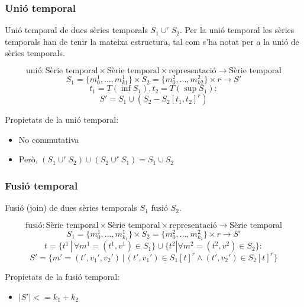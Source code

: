 \subsubsection{Unió temporal}

Unió temporal de dues sèries temporals $S_1 \cup^r S_2$. Per la unió temporal les sèries temporals han de tenir la mateixa estructura, tal com s'ha notat per a la unió de sèries temporals.

\begin{definition}
  \[
  \text{unió}: \text{Sèrie temporal} \times \text{Sèrie temporal}
  \times \text{representació} \longrightarrow \text{Sèrie temporal}
  \]
  \[
  S_1 = \{m_0^1 , \ldots , m_{k1}^1\}  \times S_2 = \{m_0^2 , \ldots , m_{k2}^2\} \times r \longrightarrow S'
  \]
  \[
  t_1=T(\inf S_1), t_2=T(\sup S_1):
  \]
  \[
  S' = S_1 \cup  ( S_2 - S_2[t_1,t_2]^r )
  \] 
\end{definition}



Propietats de la unió temporal:
\begin{itemize}
\item No commutativa
\item Però, $(S_1 \cup^r S_2) \cup (S_2 \cup^r S_1) = S_1 \cup S_2$
\end{itemize}



\subsubsection{Fusió temporal}

Fusió (join) de dues sèries temporals $S_1 \text{ fusió } S_2$.


\begin{definition}
  \[
  \text{fusió}: \text{Sèrie temporal} \times
  \text{Sèrie temporal} \times \text{representació} \longrightarrow
  \text{Sèrie temporal}
  \]
  \[
  S_1 = \{m_0^1 , \ldots , m_{k_1}^1\} \times S_2 = \{m_0^2 , \ldots ,
  m_{k_2}^2\} \times r \longrightarrow S'
  \]
  \[
  t = \{t^1 \, | \, \forall m^1=(t^1,v^1) \in S_1\} \cup \{t^2 | \forall
  m^2=(t^2,v^2) \in S_2\}:
  \]
  \[
  S' = \{m'=(t',v_1',v_2') \, | \, (t',v_1') \in S_1[t]^r \wedge (t',v_2') \in S_2[t]^r \} 
  \]
\end{definition}



Propietats de la fusió temporal:
\begin{itemize}
\item $|S'| <= k_1 + k_2$
\end{itemize}














